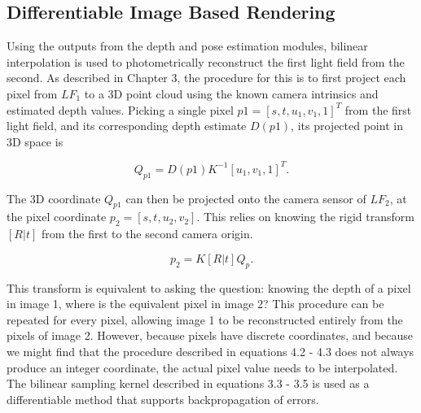 




\subsection{Differentiable Image Based Rendering}

Using the outputs from the depth and pose estimation modules, bilinear interpolation is used to photometrically reconstruct the first light field from the second. As described in Chapter 3, the procedure for this is to first project each pixel from $LF_1$ to a 3D point cloud using the known camera intrinsics and estimated depth values. Picking a single pixel $p1 = [s,t,u_1,v_1,1]^T$ from the first light field, and its corresponding depth estimate $D(p1)$, its projected point in 3D space is

\begin{equation}
    Q_{p1} = D(p1) K^{-1}[u_1,v_1,1]^T.
\end{equation}

The 3D coordinate $Q_{p1}$ can then be projected onto the camera sensor of $LF_2$, at the pixel coordinate $p_2 = [s,t,u_2,v_2]$. This relies on knowing the rigid transform $[R|t]$ from the first to the second camera origin.

\begin{equation}
    p_2 = K[R|t]Q_p.
 \end{equation}

This transform is equivalent to asking the question: knowing the depth of a pixel in image 1, where is the equivalent pixel in image 2? This procedure can be repeated for every pixel, allowing image 1 to be reconstructed entirely from the pixels of image 2. However, because pixels have discrete coordinates, and because we might find that the procedure described in equations 4.2 - 4.3 does not always produce an integer coordinate, the actual pixel value needs to be interpolated. The bilinear sampling kernel described in equations 3.3 - 3.5 is used as a differentiable method that supports backpropagation of errors. 

